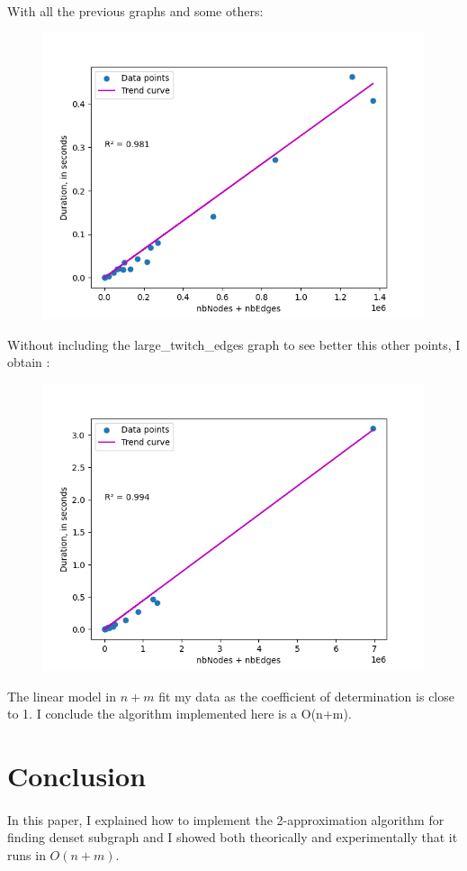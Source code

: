 \documentclass[english]{article}
\begin{document}
\begin{multicols}{2}
\paragraph{}
With all the previous graphs and some others:
\begin{figure}[H]
\includegraphics[scale=0.43]{"../results/n+m.png"}
\end{figure}
Without including the large\_twitch\_edges graph to see better this other points, I obtain : 
\begin{figure}[H]
\includegraphics[scale=0.43]{"../results/n+m_large.png"}
\end{figure}
\vfill
The linear model in $n+m$ fit my data as the coefficient of determination is close to 1. I conclude the algorithm implemented here is a O(n+m).
\section{Conclusion}
\paragraph{}
In this paper, I explained how to implement the 2-approximation algorithm for finding denset subgraph and I showed both theorically and experimentally that it runs in $O(n+m)$.
\vfill
\end{multicols}
\end{document}
